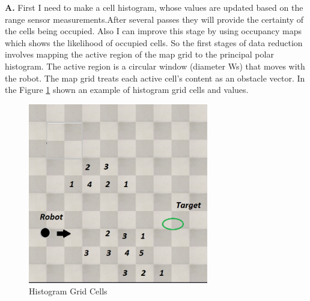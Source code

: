 \textbf{ A. } First I need to make a cell histogram, whose values are updated based on the range sensor measurements.After several passes they will provide the certainty of the cells being occupied. Also I  can improve this stage by using occupancy maps which shows the likelihood of occupied cells. So the first stages of data reduction involves mapping the active region of the map grid to the principal polar histogram. The active region is a circular window (diameter Ws) that moves with the robot. The map grid treats each active cell's content as an obstacle vector. In the Figure \ref{fig:Histogram Grid Cells} shown an example of histogram grid cells and values. 
\begin{figure}[H]
  \centering
  \includegraphics[width= 0.7\textwidth]{Figures/Grid.PNG}
  \caption[Histogram Grid Cells]{Histogram Grid Cells}
   \label{fig:Histogram Grid Cells} 
\end{figure}

